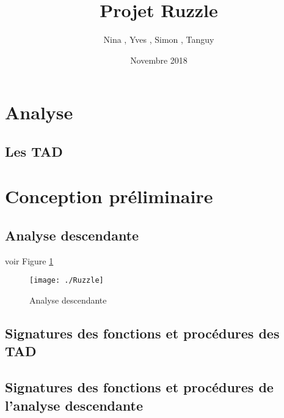 \documentclass[a4paper]{article}
\title{Projet Ruzzle}
\author{Nina \noun{Lardière}, Yves \noun{Le Guennec}, Simon \noun{Lebeaud}, Tanguy \noun{Leclerc}}
\date{Novembre 2018}
\begin{document}
	\maketitle
	\section{Analyse}
		\subsection{Les TAD}
		

 \section{Conception préliminaire}
		\subsection{Analyse descendante}
			voir Figure \ref{fig:AD}
			\begin{figure}
				\centering \texttt{[image: ./Ruzzle]} %
				\caption{\label{fig:AD}Analyse descendante}
			\end{figure}

		\subsection{Signatures des fonctions et procédures des TAD}
		
		
		
		
	\subsection{Signatures des fonctions et procédures de l'analyse descendante}
\end{document}
